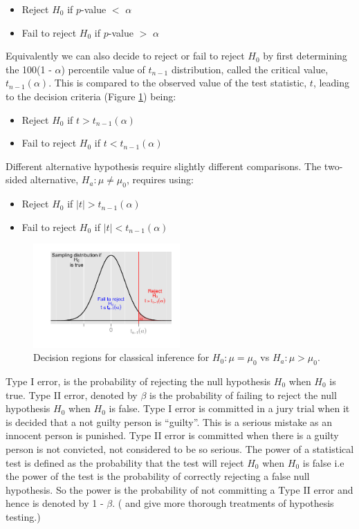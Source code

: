 \begin{itemize} \itemsep 0in
\item Reject $H_0$ if $p$-value $<$ $\alpha$
\item Fail to reject $H_0$ if $p$-value $>$ $\alpha$
\end{itemize}

Equivalently we can also decide to reject or fail to reject $H_0$ by first determining the 100(1 - $\alpha$) percentile value of $t_{n-1}$ distribution, called the critical value, $t_{n-1}(\alpha)$. This is compared to the observed value of the test statistic, $t$, leading to the decision criteria (Figure \ref{classical}) being:

\begin{itemize} \itemsep 0in
\item Reject $H_0$ if $t > t_{n-1}(\alpha)$
\item Fail to reject $H_0$ if $t < t_{n-1}(\alpha)$
\end{itemize}

Different alternative hypothesis require slightly different comparisons. The two-sided alternative, $H_a: \mu \ne \mu_0$, requires using: 

\begin{itemize}\itemsep 0in
\item Reject $H_0$ if $|t| > t_{n-1}(\alpha)$
\item Fail to reject $H_0$ if $|t| < t_{n-1}(\alpha)$
\end{itemize}

\begin{figure}[htp]
\centerline{\includegraphics[width=0.5\textwidth]{diagram.pdf}}
\caption{Decision regions  for classical inference for $H_0: \mu=\mu_0$ vs $H_a:\mu>\mu_0$.}
\label{classical}
\end{figure}

Type I error, is the probability of rejecting the null hypothesis $H_0$ when $H_0$ is true. Type II error, denoted by $\beta$ is the probability of failing to reject the null hypothesis $H_0$ when $H_0$ is false. Type I error is committed in a jury trial when it is decided that a not guilty person is  ``guilty''. This is a serious mistake as an innocent person is punished. Type II error is committed when there is a guilty person is not convicted, not considered to be so serious. The power of a statistical test is defined as the probability that the test will reject $H_0$ when $H_0$ is false i.e the power of the test is the probability of correctly rejecting a false null hypothesis. So the power is the probability of not committing a Type II error and hence is denoted by 1 - $\beta$. (\cite{casella:2002} and \cite{lehman:1997} give more thorough treatments of hypothesis testing.)
 
